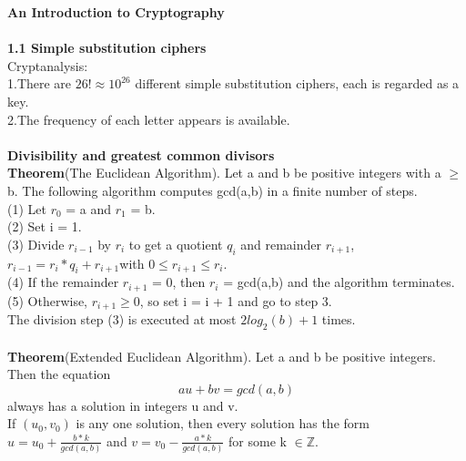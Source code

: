 \documentclass[12pt,a4paper]{article}
\begin{document}
\begin{flushleft}

\textbf{An Introduction to Cryptography\\}
~\\
\textbf{1.1 Simple substitution ciphers\\}
Cryptanalysis: \\
1.There are $26! \approx 10^{26}$ different simple substitution ciphers, each is regarded as a key.\\
2.The frequency of each letter appears is available.\\
~\\
\textbf{Divisibility and greatest common divisors\\}
\textbf{Theorem}(The Euclidean Algorithm). Let a and b be positive integers with a $\geq$ b. The following algorithm computes gcd(a,b) in a finite number of steps.\\
(1) Let $r_0$ = a and $r_1$ = b.\\
(2) Set i = 1.\\
(3) Divide $r_{i-1}$ by $r_i$ to get a quotient $q_i$ and remainder $r_{i+1}$,\\
\hspace{20mm}$r_{i-1} = r_i * q_i + r_{i+1}$\hspace{5mm}with $0 \leq r_{i+1} \leq r_{i}$.\\
(4) If the remainder $r_{i+1}$ = 0, then $r_i$ = gcd(a,b) and the algorithm terminates.\\
(5) Otherwise, $r_{i+1} \geq 0$, so set i = i + 1 and go to step 3.\\
The division step (3) is executed at most $2log_2(b) + 1$ times.\\
~\\
\textbf{Theorem}(Extended Euclidean Algorithm). Let a and b be positive integers. Then the equation\\
$$au + bv = gcd(a,b)$$
always has a solution in integers u and v.\\
If $(u_0, v_0)$ is any one solution, then every solution has the form\\
$u = u_0 + \frac{b*k}{gcd(a,b)}$ \hspace{2mm} and \hspace{2mm} $v = v_0 - \frac{a*k}{gcd(a,b)}$ \hspace{5mm} for some k $\in \mathbb{Z}$.\\

\end{flushleft}
\end{document}
